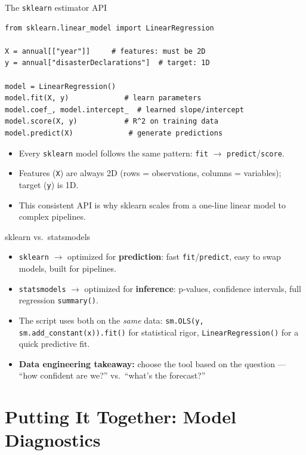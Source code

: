\documentclass[11pt,aspectratio=43]{beamer}
\begin{document}
\begin{frame}[fragile]{The \texttt{sklearn} estimator API}
\begin{lstlisting}
from sklearn.linear_model import LinearRegression

X = annual[["year"]]     # features: must be 2D
y = annual["disasterDeclarations"]  # target: 1D

model = LinearRegression()
model.fit(X, y)             # learn parameters
model.coef_, model.intercept_  # learned slope/intercept
model.score(X, y)           # R^2 on training data
model.predict(X)             # generate predictions
\end{lstlisting}
\begin{itemize}
  \item Every \texttt{sklearn} model follows the same pattern: \texttt{fit} $\to$ \texttt{predict}/\texttt{score}.
  \item Features (\texttt{X}) are always 2D (rows = observations, columns = variables); target (\texttt{y}) is 1D.
  \item This consistent API is why sklearn scales from a one-line linear model to complex pipelines.
\end{itemize}
\end{frame}

\begin{frame}{sklearn vs.\ statsmodels}
\begin{itemize}
  \item \texttt{sklearn} $\rightarrow$ optimized for \textbf{prediction}: fast \texttt{fit}/\texttt{predict}, easy to swap models, built for pipelines.
  \item \texttt{statsmodels} $\rightarrow$ optimized for \textbf{inference}: p-values, confidence intervals, full regression \texttt{summary()}.
  \item The script uses both on the \emph{same} data: \texttt{sm.OLS(y, sm.add\_constant(x)).fit()} for statistical rigor, \texttt{LinearRegression()} for a quick predictive fit.
  \item \textbf{Data engineering takeaway:} choose the tool based on the question --- ``how confident are we?'' vs.\ ``what's the forecast?''
\end{itemize}
\end{frame}

\section{Putting It Together: Model Diagnostics}
\end{document}
